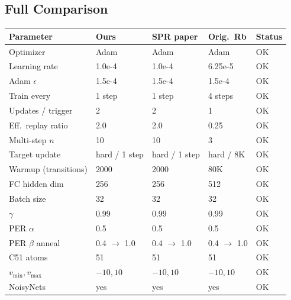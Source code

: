 \documentclass[11pt]{article}
\newcommand{\ok}{\textcolor{green!60!black}{OK}}
\begin{document}
\subsection{Full Comparison}

\begin{table}[H]
\centering
\footnotesize
\renewcommand{\arraystretch}{1.5}
\setlength{\tabcolsep}{3pt}
\begin{tabular}{l l l l l}
\toprule
\textbf{Parameter} & \textbf{Ours} & \textbf{SPR paper}
  & \textbf{Orig.\ Rb} & \textbf{Status} \\
\midrule
Optimizer           & Adam           & Adam              & Adam           & \ok \\
Learning rate       & 1.0e-4         & 1.0e-4            & 6.25e-5        & \ok \\
Adam $\epsilon$     & 1.5e-4         & 1.5e-4            & 1.5e-4         & \ok \\
Train every         & 1 step         & 1 step            & 4 steps        & \ok \\
Updates / trigger   & 2              & 2                 & 1              & \ok \\
Eff.\ replay ratio  & 2.0            & 2.0               & 0.25           & \ok \\
Multi-step $n$      & 10             & 10                & 3              & \ok \\
Target update       & hard / 1 step  & hard / 1 step     & hard / 8K      & \ok \\
Warmup (transitions)& 2000           & 2000              & 80K            & \ok \\
FC hidden dim       & 256            & 256               & 512            & \ok \\
Batch size          & 32             & 32                & 32             & \ok \\
$\gamma$            & 0.99           & 0.99              & 0.99           & \ok \\
PER $\alpha$        & 0.5            & 0.5               & 0.5            & \ok \\
PER $\beta$ anneal  & 0.4 $\to$ 1.0 & 0.4 $\to$ 1.0     & 0.4 $\to$ 1.0 & \ok \\
C51 atoms           & 51             & 51                & 51             & \ok \\
$v_{\min}, v_{\max}$& $-10, 10$      & $-10, 10$         & $-10, 10$      & \ok \\
NoisyNets           & yes            & yes               & yes            & \ok \\

\end{tabular}
\end{table}
\end{document}
